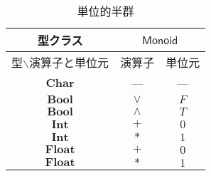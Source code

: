 \documentclass[twocolumn]{jsbook}
\newcommand{\hsklType}[1]{\textbf{#1}}
\newcommand{\hsklTypeclass}[1]{\mathsf{#1}}
\newcommand{\hsklBool}{\hsklType{Bool}}
\newcommand{\hsklChar}{\hsklType{Char}}
\newcommand{\hsklInt}{\hsklType{Int}}
\newcommand{\hsklFloat}{\hsklType{Float}}
\newcommand{\hsklMonoid}{\hsklTypeclass{Monoid}}
\begin{document}
\begin{table}
\caption{単位的半群}
\label{tab:monoids}
\begin{center}
\begin{tabular}{||c||c|c||}
\hline
型クラス
    &\multicolumn{2}{|c||}{$\hsklMonoid$}\\
\hline\hline
型$\backslash$演算子と単位元
    &演算子
    &単位元\\
\hline
$\hsklChar$
    &---
    &---\\
\hline
$\hsklBool$
    &$\vee$
    &$F$\\
\hline
$\hsklBool$
    &$\wedge$
    &$T$\\
\hline
$\hsklInt$
    &$+$
    &$0$\\
\hline
$\hsklInt$
    &$*$
    &$1$\\
\hline
$\hsklFloat$
    &$+$
    &$0$\\
\hline
$\hsklFloat$
    &$*$
    &$1$\\
\hline
\end{tabular}
\end{center}
\end{table}
\end{document}
